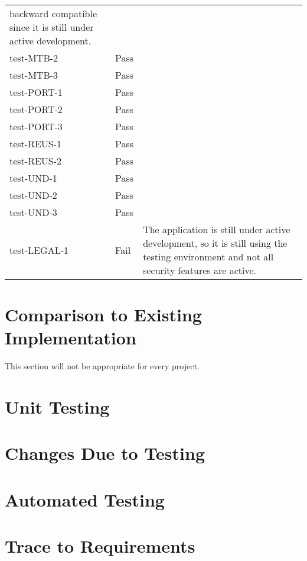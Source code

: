 \documentclass[12pt, titlepage]{article}
\begin{document}
\begin{longtable}{>{\centering\arraybackslash}p{} >{\centering\arraybackslash}p{} >{\centering\arraybackslash}p{}}
    backward compatible since it is still under active development. \\
    test-MTB-2 & Pass &  \\
    test-MTB-3 & Pass &  \\
    \midrule
    test-PORT-1 & Pass &  \\
    test-PORT-2 & Pass &  \\
    test-PORT-3 & Pass &  \\
    \midrule
    test-REUS-1 & Pass &  \\
    test-REUS-2 & Pass &  \\
    \midrule
    test-UND-1 & Pass &  \\
    test-UND-2 & Pass &  \\
    test-UND-3 & Pass &  \\
    \midrule
    test-LEGAL-1 & Fail & The application is still under active development, so
    it is still using the testing environment and not all security features are
    active. \\
    \bottomrule
\end{longtable}


	
\section{Comparison to Existing Implementation}	

This section will not be appropriate for every project.

\section{Unit Testing}

\section{Changes Due to Testing}


\section{Automated Testing}
		
\section{Trace to Requirements}
		
\end{document}
